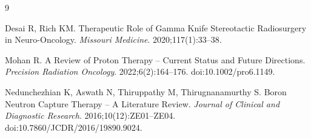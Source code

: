 \documentclass[12pt,hyperref,a4paper,UTF8,fontset=fandol]{ctexart}
\begin{document}
\begin{thebibliography}{9}

Desai R, Rich KM.
Therapeutic Role of Gamma Knife Stereotactic Radiosurgery in Neuro-Oncology.
\textit{Missouri Medicine}. 2020;117(1):33--38.

Mohan R.
A Review of Proton Therapy -- Current Status and Future Directions.
\textit{Precision Radiation Oncology}. 2022;6(2):164--176.
doi:10.1002/pro6.1149.

Nedunchezhian K, Aswath N, Thiruppathy M, Thirugnanamurthy S.
Boron Neutron Capture Therapy -- A Literature Review.
\textit{Journal of Clinical and Diagnostic Research}. 2016;10(12):ZE01--ZE04.
doi:10.7860/JCDR/2016/19890.9024.

\end{thebibliography}
\end{document}
